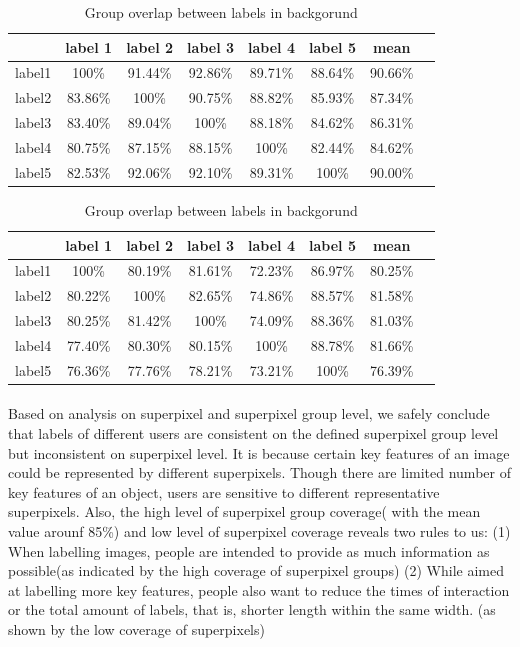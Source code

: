 \documentclass[runningheads,a4paper]{llncs}
\begin{document}
\begin{table}
\parbox{.35\linewidth}{
\centering
\begin{tabular}{|c|c|c|c|c|c|c|c|}
\hline
 & label 1 & label 2&label 3&label 4&label 5&mean\\
\hline
label1& 100\% & 91.44\% & 92.86\%& 89.71\%& 88.64\%&90.66\%\\
\hline
label2& 83.86\% & 100\% & 90.75\%& 88.82\%& 85.93\%&87.34\%\\
\hline
label3& 83.40\% & 89.04\% & 100\%& 88.18\%& 84.62\%&86.31\% \\
\hline
label4& 80.75\% & 87.15\% & 88.15\%& 100\%& 82.44\%&84.62\% \\
\hline
label5& 82.53\% & 92.06\% & 92.10\%& 89.31\%& 100\%&90.00\% \\
\hline
\end{tabular}\captionsetup{justification=centerlast}
\caption{Group overlap between labels in foregorund}
\label{ta:group overlap f}
}
\hfill
\parbox{.35\linewidth}{
\centering
\begin{tabular}{|c|c|c|c|c|c|c|c|}
\hline
 & label 1 & label 2&label 3&label 4&label 5&mean\\
\hline
label1& 100\% &80.19\% & 81.61\%& 72.23\%& 86.97\%&80.25\%\\
\hline
label2& 80.22\% & 100\% & 82.65\%& 74.86\%& 88.57\%&81.58\% \\
\hline
label3& 80.25\% & 81.42\% & 100\%& 74.09\%& 88.36\%&81.03\%\\
\hline
label4& 77.40\% & 80.30\% & 80.15\%& 100\%& 88.78\%&81.66\% \\
\hline
label5& 76.36\% & 77.76\% & 78.21\%& 73.21\%& 100\%&76.39\%\\
\hline
\end{tabular}

\captionsetup{justification=centerlast}
\caption{Group overlap between labels in backgorund}
\label{ta:group overlap b}
}
\end{table}



\paragraph{}Based on analysis on superpixel and superpixel group level, we safely conclude that labels of different users are consistent on the defined superpixel group level but inconsistent on superpixel level. It is because certain key features of an image could be represented by different superpixels. Though there are limited number of key features of an object, users are sensitive to different representative superpixels. Also, the high level of superpixel group coverage( with the mean value arounf 85\%) and low level of superpixel coverage reveals two rules to us: (1) When labelling images, people are intended to provide as much information as possible(as indicated by the high coverage of superpixel groups)  (2) While aimed at labelling more key features, people also want to reduce the times of interaction or the total amount of labels, that is, shorter length within the same width. (as shown by the low coverage of superpixels)
\end{document}

